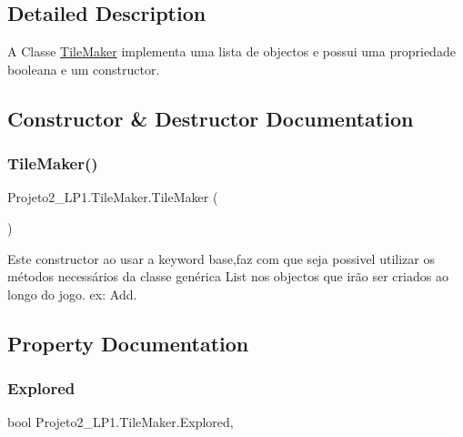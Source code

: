 \subsection{Detailed Description}
A Classe \mbox{\hyperlink{class_projeto2___l_p1_1_1_tile_maker}{Tile\+Maker}} implementa uma lista de objectos e possui uma propriedade booleana e um constructor. 



\subsection{Constructor \& Destructor Documentation}
\mbox{\label{class_projeto2___l_p1_1_1_tile_maker_af3a223b333dda1fdea8379c8893cef03}} 
\subsubsection{\texorpdfstring{Tile\+Maker()}{TileMaker()}}
{\footnotesize\ttfamily Projeto2\+\_\+\+L\+P1.\+Tile\+Maker.\+Tile\+Maker (\begin{DoxyParamCaption}{ }\end{DoxyParamCaption})\hspace{0.3cm}{\ttfamily [inline]}}



Este constructor ao usar a keyword base,faz com que seja possivel utilizar os métodos necessários da classe genérica List nos objectos que irão ser criados ao longo do jogo. ex\+: Add. 



\subsection{Property Documentation}
\mbox{\label{class_projeto2___l_p1_1_1_tile_maker_a9730098dc5d820a5f8e6cebb2cbce4c4}} 
\subsubsection{\texorpdfstring{Explored}{Explored}}
{\footnotesize\ttfamily bool Projeto2\+\_\+\+L\+P1.\+Tile\+Maker.\+Explored\hspace{0.3cm}{\ttfamily [get]}, {\ttfamily [set]}}



